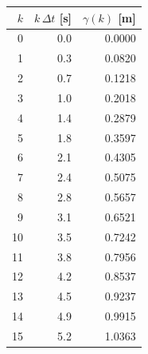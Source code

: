 \begin{tabular}{rrr}
  \toprule
  $k$ & $k\,\Delta t$ [s] & $\gamma(k)$ [m] \\
  \midrule
  0 & 0.0 & 0.0000 \\
  1 & 0.3 & 0.0820 \\
  2 & 0.7 & 0.1218 \\
  3 & 1.0 & 0.2018 \\
  4 & 1.4 & 0.2879 \\
  5 & 1.8 & 0.3597 \\
  6 & 2.1 & 0.4305 \\
  7 & 2.4 & 0.5075 \\
  8 & 2.8 & 0.5657 \\
  9 & 3.1 & 0.6521 \\
  10 & 3.5 & 0.7242 \\
  11 & 3.8 & 0.7956 \\
  12 & 4.2 & 0.8537 \\
  13 & 4.5 & 0.9237 \\
  14 & 4.9 & 0.9915 \\
  15 & 5.2 & 1.0363 \\
  \bottomrule
\end{tabular}
